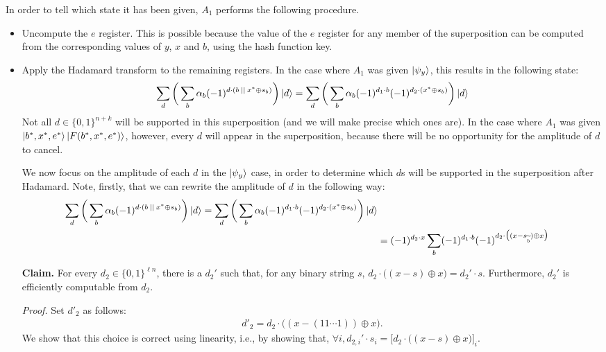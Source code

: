 \documentclass{article}
\begin{document}
In order to tell which state it has been given, $A_1$ performs the following procedure.
\begin{itemize}
    \item Uncompute the $e$ register. This is possible because the value of the $e$ register for any member of the superposition can be computed from the corresponding values of $y$, $x$ and $b$, using the hash function key.
    \item Apply the Hadamard transform to the remaining registers. In the case where $A_1$ was given $\ket{\psi_y}$, this results in the following state:
    \begin{align}
        \sum_d \bigg( \sum_b \alpha_b (-1)^{d \cdot (b \: || \: x^* \oplus s_b)} \bigg) \ket{d} = \sum_d \bigg( \sum_b \alpha_b (-1)^{d_1 \cdot b} (-1)^{d_2 \cdot (x^* \oplus s_{b})} \bigg) \ket{d}
    \end{align}
    Not all $d \in \{0,1\}^{n + k}$ will be supported in this superposition (and we will make precise which ones are). In the case where $A_1$ was given $\ket{b^*, x^*, e^*} \ket{F(b^*, x^*, e^*)}$, however, every $d$ will appear in the superposition, because there will be no opportunity for the amplitude of $d$ to cancel.
    
    We now focus on the amplitude of each $d$ in the $\ket{\psi_y}$ case, in order to determine which $d$s will be supported in the superposition after Hadamard. Note, firstly, that we can rewrite the amplitude of $d$ in the following way:
    \begin{align}
    \begin{split}
        \sum_d \bigg( \sum_b \alpha_b (-1)^{d \cdot (b \: || \: x^* \oplus s_b)} \bigg) \ket{d} = \sum_d \bigg( \sum_b \alpha_b (-1)^{d_1 \cdot b} (-1)^{d_2 \cdot (x^* \oplus s_{b})} \bigg) \ket{d} \\
        &= (-1)^{d_2 \cdot x} \sum_b (-1)^{d_1 \cdot b} (-1)^{d_2 \cdot \big( (x - s_{\widetilde{b}}) \oplus x \big)}
    \end{split}
    \end{align}
    
    \textbf{Claim.} For every $d_2 \in \{0,1\}^{\ell n}$, there is a $d_2'$ such that, for any binary string $s$, $d_2 \cdot \big( (x - s) \oplus x \big) = d_2' \cdot s$. Furthermore, $d_2'$ is efficiently computable from $d_2$.
    
    \textit{Proof.} Set $d'_2$ as follows:
    \begin{align}
        d'_2 = d_2 \cdot \big( (x - (11 \cdots 1)) \oplus x \big).
    \end{align}
    We show that this choice is correct using linearity, i.e., by showing that, $\forall i, d_{2, i}' \cdot s_i = \big[ d_2 \cdot \big( (x - s) \oplus x \big) \big]_i$.
\end{itemize}



\end{document}
